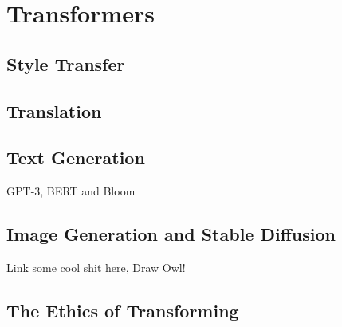 \setchapterpreamble[u]{\margintoc}
\chapter{Transformers}

\section{Style Transfer}
\section{Translation}
\section{Text Generation}

GPT-3, BERT and Bloom

\section{Image Generation and Stable Diffusion}

Link some cool shit here, Draw Owl!

\section{The Ethics of Transforming}


